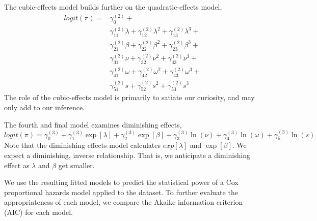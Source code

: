 The cubic-effects model builds further on the quadratic-effects model,
%
\begin{equation}
\begin{aligned}
    logit(\pi) = &  \gamma^{(2)}_{0} + \\ &
        \gamma^{(2)}_{11} \lambda + 
        \gamma^{(2)}_{12} \lambda^2 + 
        \gamma^{(2)}_{13} \lambda^3 + \\ &
        \gamma^{(2)}_{21} \beta +
        \gamma^{(2)}_{22} \beta^2 +
        \gamma^{(2)}_{23} \beta^3 + \\ &
        \gamma^{(2)}_{31} \nu + 
        \gamma^{(2)}_{32} \nu^2 + 
        \gamma^{(2)}_{33} \nu^3 + \\ &
        \gamma^{(2)}_{41} \omega +
        \gamma^{(2)}_{42} \omega^2 +
        \gamma^{(2)}_{43} \omega^3 + \\ &
        \gamma^{(2)}_{51} s +
        \gamma^{(2)}_{52} s^2 +
        \gamma^{(2)}_{53} s^3
\end{aligned}
\end{equation}
%
The role of the cubic-effects model is primarily to satiate our curiosity, and may only add to our inference. 

The fourth and final model examines diminishing effects,
%
\begin{equation}
    logit(\pi)  = \gamma^{(3)}_{0} + 
        \gamma^{(3)}_{1} \exp[\lambda] + 
        \gamma^{(3)}_{2} \exp[\beta] + 
        \gamma^{(3)}_{3} \ln(\nu) +
        \gamma^{(3)}_{4} \ln(\omega) +
        \gamma^{(3)}_{5} \ln(s)
\end{equation}
%
Note that the diminishing effects model calculates $exp[\lambda]$ and $\exp[\beta]$. We expect a diminishing, inverse relationship. That is, we anticipate a diminishing effect as $\lambda$ and $\beta$ get smaller. 

We use the resulting fitted models to predict the statistical power of a Cox proportional hazards model applied to the dataset. To further evaluate the appropriateness of each model, we compare the Akaike information criterion (AIC) \cite{hyndman, sakamoto} for each model. 
